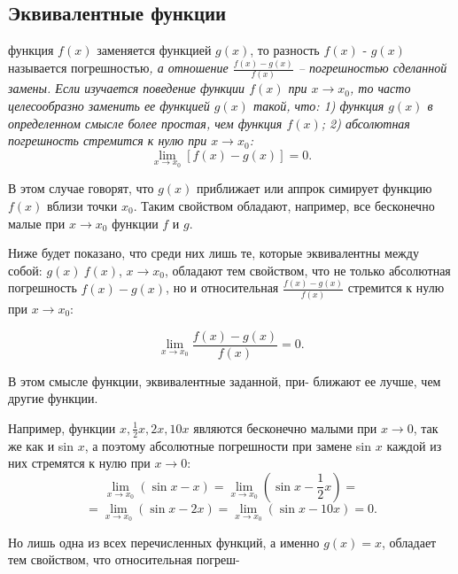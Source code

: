 \documentclass[a4paper,12pt,cmcyralt]{article}
\begin{document}
\setcounter{section}{8}
\setcounter{subsection}{2}
\noindent\subsection{Эквивалентные функции}


 функция $f(x)$ заменяется функцией $g(x)$, то разность $f(x)$ - $g(x)$ называется  погрешностью\em, а отношение $\frac{f(x) - g(x)}{f(x)}$ --  погрешностью \em сделанной замены. Если изучается поведение функции $f(x)$ при $x \rightarrow x_0$, то часто целесообразно заменить ее функцией $g(x)$ такой, что: 1) функция $g(x)$ в определенном смысле более простая, чем функция $f(x)$; 2) абсолютная погрешность стремится к нулю при $x \rightarrow x_0$:
$$ \lim\limits_{x\to x_0} [f(x) - g(x)] =0 .$$

В этом случае говорят, что $g(x)$ приближает или аппрок симирует функцию $f(x)$ вблизи точки $x_0$. Таким свойством обладают, например, все бесконечно малые при $x\to x_0$ функции $f$ и $g$.

Ниже будет показано, что среди них лишь те, которые эквивалентны между собой: $g(x)~f(x)$, $x\to x_0$, обладают тем свойством, что не только абсолютная погрешность $f(x) - g(x)$, но и относительная $\frac{f(x) - g(x)}{f(x)}$ стремится к нулю при $x\to x_0$:

$$ \lim\limits_{x\to x_0} \frac{f(x) - g(x)}{f(x)} =0 .$$

В этом смысле функции, эквивалентные заданной, при- ближают ее лучше, чем другие функции.

Например, функции $x, \frac{1}{2}x, 2x, 10x$ являются бесконечно малыми при $ x \to 0$, так же как и sin $x$, а поэтому абсолютные погрешности при замене sin $x$ каждой из них стремятся к нулю при $ x \to 0$:
\[ \lim\limits_{x\to x_0} (\sin x - x) = \lim\limits_{x\to x_0} (\sin x -  \frac{1}{2} x) =\] 
\[ =\lim\limits_{x\to x_0} (\sin x - 2x) = \lim\limits_{x\to x_0} (\sin x - 10x) = 0.\]

Но лишь одна из всех перечисленных функций, а именно $g(x) = x$, обладает тем свойством, что относительная погреш-
\end{document}
